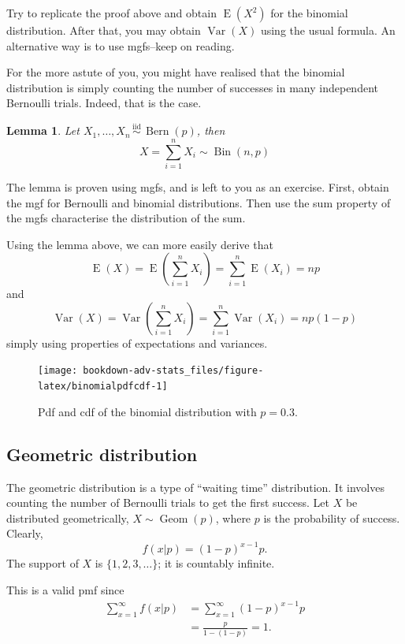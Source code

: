 \documentclass[
]{book}
\DeclareMathOperator{\E}{E}
\DeclareMathOperator{\Var}{Var}
\DeclareMathOperator{\Bin}{Bin}
\DeclareMathOperator{\Bern}{Bern}
\DeclareMathOperator{\Geom}{Geom}
\newcommand{\iid}{\,\overset{\text{iid}}{\sim}\,}
\newtheorem{lemma}{Lemma}[chapter]
\theoremstyle{definition}
\theoremstyle{definition}
\theoremstyle{definition}
\theoremstyle{definition}
\theoremstyle{remark}
\begin{document}
Try to replicate the proof above and obtain \(\E(X^2)\) for the binomial distribution. After that, you may obtain \(\Var(X)\) using the usual formula.
An alternative way is to use mgfs--keep on reading.

For the more astute of you, you might have realised that the binomial distribution is simply counting the number of successes in many independent Bernoulli trials.
Indeed, that is the case.

\begin{lemma}
Let \(X_1,\dots,X_n\iid\Bern(p)\), then
\[
X = \sum_{i=1}^n X_i \sim \Bin(n,p)
\]
\end{lemma}

The lemma is proven using mgfs, and is left to you as an exercise.
First, obtain the mgf for Bernoulli and binomial distributions.
Then use the sum property of the mgfs characterise the distribution of the sum.

Using the lemma above, we can more easily derive that
\[
\E(X) = \E\left(\sum_{i=1}^n X_i \right) = \sum_{i=1}^n \E(X_i) = np
\]
and
\[
\Var(X) = \Var\left(\sum_{i=1}^n X_i \right) = \sum_{i=1}^n \Var(X_i) = np(1-p)
\]
simply using properties of expectations and variances.

\begin{figure}

{\centering \texttt{[image: bookdown-adv-stats\_files/figure-latex/binomialpdfcdf-1]} 

}

\caption{Pdf and cdf of the binomial distribution with \(p=0.3\).}\label{fig:binomialpdfcdf}
\end{figure}

\hypertarget{geometric-distribution}{%
\subsection{Geometric distribution}\label{geometric-distribution}}

The geometric distribution is a type of ``waiting time'' distribution.
It involves counting the number of Bernoulli trials to get the first success.
Let \(X\) be distributed geometrically, \(X\sim\Geom(p)\), where \(p\) is the probability of success. Clearly,
\[
  f(x|p)=(1-p)^{x-1}p.
\]
The support of \(X\) is \(\{1,2,3,\dots\}\); it is countably infinite.

This is a valid pmf since
\begin{align*}
\sum_{x=1}^\infty f(x|p) 
&= \sum_{x=1}^\infty (1-p)^{x-1}p  \\
&= \frac{p}{1-(1-p)} = 1.
\end{align*}
\end{document}
